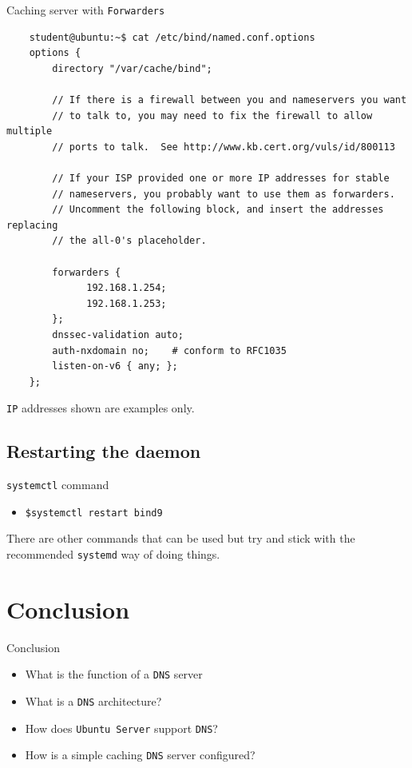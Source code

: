 \documentclass{beamer}
\begin{document}
\begin{frame}[fragile]{Caching server with \texttt{Forwarders}}
  \begin{lstlisting}
    student@ubuntu:~$ cat /etc/bind/named.conf.options
    options {
        directory "/var/cache/bind";

        // If there is a firewall between you and nameservers you want
        // to talk to, you may need to fix the firewall to allow multiple
        // ports to talk.  See http://www.kb.cert.org/vuls/id/800113

        // If your ISP provided one or more IP addresses for stable
        // nameservers, you probably want to use them as forwarders.
        // Uncomment the following block, and insert the addresses replacing
        // the all-0's placeholder.

        forwarders {
 		      192.168.1.254; 
		      192.168.1.253;
        };
        dnssec-validation auto;
        auth-nxdomain no;    # conform to RFC1035
        listen-on-v6 { any; };
    };
  \end{lstlisting}
  \begin{tcolorbox}[title={\textbf{NOTE:}}]
    \texttt{IP} addresses shown are examples only.
  \end{tcolorbox}
\end{frame}

\subsection{Restarting the daemon}
\begin{frame}{\texttt{systemctl} command}
  \begin{itemize}
    \item \texttt{\$systemctl restart bind9}
  \end{itemize}
  \begin{tcolorbox}[title={\textbf{NOTE:}}]
    There are other commands that can be used but try and stick with the recommended \texttt{systemd} way of doing things.
  \end{tcolorbox} 
\end{frame}

\section*{Conclusion}
\begin{frame}{Conclusion}
  \begin{itemize}
    \item What is the function of a \texttt{DNS} server
    \item What is a \texttt{DNS} architecture?
    \item How does \texttt{Ubuntu Server} support \texttt{DNS}?
    \item How is a simple caching \texttt{DNS} server configured?
  \end{itemize}
\end{frame}
\end{document}
